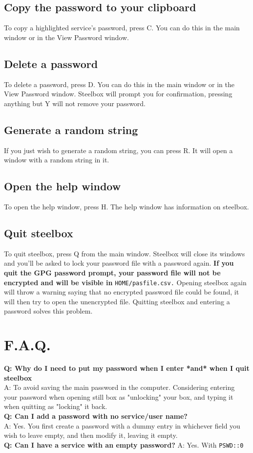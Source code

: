 \documentclass{article}
\begin{document}
  \subsection{Copy the password to your clipboard}
  To copy a highlighted service's password, press C. You can do this in the main window or in the View Password window.

  \subsection{Delete a password}
  To delete a password, press D. You can do this in the main window or in the View Password window. Steelbox will prompt you for
  confirmation, pressing anything but Y will not remove your password.

  \subsection{Generate a random string}
  If you just wish to generate a random string, you can press R. It will open a window with a random string in it.

  \subsection{Open the help window}
  To open the help window, press H. The help window has information on steelbox.

  \subsection{Quit steelbox}
  To quit steelbox, press Q from the main window. Steelbox will close its windows and you'll be asked to lock your password file with a password again.
  \textbf{If you quit the GPG password prompt, your password file will not be encrypted and will be visible in} \texttt{\textdollar HOME/pasfile.csv.}
  Opening steelbox again will throw a warning saying that no encrypted password file could be found, it will then try to open the unencrypted file.
  Quitting steelbox and entering a password solves this problem.

  \section{F.A.Q.}
  \textbf{Q: Why do I need to put my password when I enter *and* when I quit steelbox}\\
  A: To avoid saving the main password in the computer. Considering entering your password when opening still box as "unlocking" your box, and typing
  it when quitting as "locking" it back.\\
  \textbf{Q: Can I add a password with no service/user name?}\\
  A: Yes. You first create a password with a dummy entry in whichever field you wish to leave empty, and then modify it, leaving it empty.\\
  \textbf{Q: Can I have a service with an empty password?}
  A: Yes. With \texttt{PSWD::0}
\end{document}
